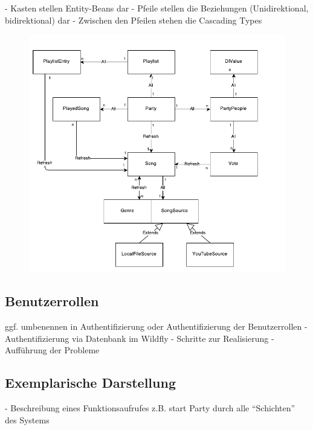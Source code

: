 - Kasten stellen Entity-Beans dar
- Pfeile stellen die Beziehungen (Unidirektional, bidirektional) dar
- Zwischen den Pfeilen stehen die Cascading Types

\begin{figure}[H]
\centering
\includegraphics[width=1\linewidth]{Bilder/EntityBeansModelMitCascading}
\caption{}
\label{fig:EntityBeansModelMitCascading}
\end{figure}


\subsection{Benutzerrollen}
ggf. umbenennen in Authentifizierung oder Authentifizierung der Benutzerrollen
- Authentifizierung via Datenbank im Wildfly
- Schritte zur Realisierung
- Aufführung der Probleme


\subsection{Exemplarische Darstellung}

- Beschreibung eines Funktionsaufrufes z.B. start Party durch alle "`Schichten"' des Systems



